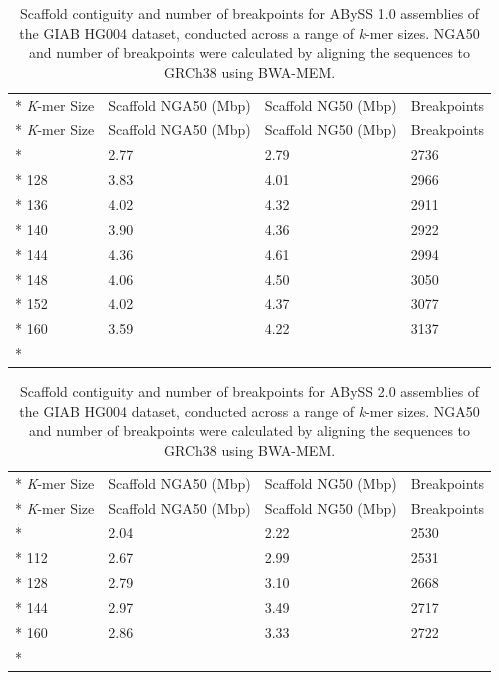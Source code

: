 \documentclass[
  12pt,
  oneside,
  openany]{book}
\begin{document}
\begin{appendices}
\hypertarget{tbl:kabyss1}{}
\begin{singlespace}
\small
\begin{longtable}[]{@{}llll@{}}
\caption[Scaffold contiguity and number of breakpoints for ABySS 1.0 assemblies of the GIAB HG004 dataset, conducted across a range of \emph{k}-mer sizes.]{\label{tbl:kabyss1}Scaffold contiguity and number of breakpoints for ABySS 1.0 assemblies of the GIAB HG004 dataset, conducted across a range of \emph{k}-mer sizes. NGA50 and number of breakpoints were calculated by aligning the sequences to GRCh38 using BWA-MEM.}\tabularnewline*
\toprule
\emph{K}-mer Size & Scaffold NGA50 (Mbp) & Scaffold NG50 (Mbp) & Breakpoints\tabularnewline*
\midrule
\endfirsthead
\toprule
\emph{K}-mer Size & Scaffold NGA50 (Mbp) & Scaffold NG50 (Mbp) & Breakpoints\tabularnewline*
\midrule
\endhead
96 & 2.77 & 2.79 & 2736\tabularnewline*
128 & 3.83 & 4.01 & 2966\tabularnewline*
136 & 4.02 & 4.32 & 2911\tabularnewline*
140 & 3.90 & 4.36 & 2922\tabularnewline*
144 & 4.36 & 4.61 & 2994\tabularnewline*
148 & 4.06 & 4.50 & 3050\tabularnewline*
152 & 4.02 & 4.37 & 3077\tabularnewline*
160 & 3.59 & 4.22 & 3137\tabularnewline*
\bottomrule
\end{longtable}
\end{singlespace}

\hypertarget{tbl:kabyss2}{}
\begin{singlespace}
\small
\begin{longtable}[]{@{}llll@{}}
\caption[Scaffold contiguity and number of breakpoints for ABySS 2.0 assemblies of the GIAB HG004 dataset, conducted across a range of \emph{k}-mer sizes.]{\label{tbl:kabyss2}Scaffold contiguity and number of breakpoints for ABySS 2.0 assemblies of the GIAB HG004 dataset, conducted across a range of \emph{k}-mer sizes. NGA50 and number of breakpoints were calculated by aligning the sequences to GRCh38 using BWA-MEM.}\tabularnewline*
\toprule
\emph{K}-mer Size & Scaffold NGA50 (Mbp) & Scaffold NG50 (Mbp) & Breakpoints\tabularnewline*
\midrule
\endfirsthead
\toprule
\emph{K}-mer Size & Scaffold NGA50 (Mbp) & Scaffold NG50 (Mbp) & Breakpoints\tabularnewline*
\midrule
\endhead
96 & 2.04 & 2.22 & 2530\tabularnewline*
112 & 2.67 & 2.99 & 2531\tabularnewline*
128 & 2.79 & 3.10 & 2668\tabularnewline*
144 & 2.97 & 3.49 & 2717\tabularnewline*
160 & 2.86 & 3.33 & 2722\tabularnewline*
\bottomrule
\end{longtable}
\end{singlespace}


\end{appendices}
\end{document}
